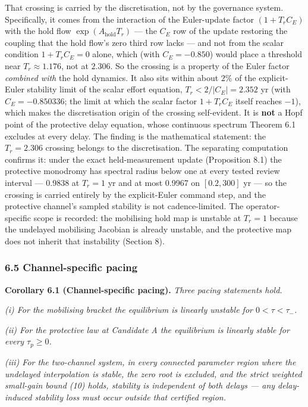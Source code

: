\documentclass[11pt]{article}
\begin{document}
That crossing is carried by the discretisation, not by the governance
system. Specifically, it comes from the interaction of the Euler-update
factor \((1 + T_r C_E)\) with the hold flow
\(\exp(A_{\mathrm{hold}}T_r)\) --- the \(C_E\) row of the update
restoring the coupling that the hold flow's zero third row lacks --- and
not from the scalar condition \(1 + T_r C_E = 0\) alone, which (with
\(C_E = -0.850\)) would place a threshold near \(T_r \approx 1.176\),
not at \(2.306\). So the crossing is a property of the Euler factor
\emph{combined with} the hold dynamics. It also sits within about
\(2\%\) of the explicit-Euler stability limit of the scalar effort
equation, \(T_r < 2/|C_E| = 2.352\) yr (with \(C_E = -0.850336\); the
limit at which the scalar factor \(1 + T_r C_E\) itself reaches \(-1\)),
which makes the discretisation origin of the crossing self-evident. It
is \textbf{not} a Hopf point of the protective delay equation, whose
continuous spectrum Theorem 6.1 excludes at every delay. The finding is
the mathematical statement: the \(T_r = 2.306\) crossing belongs to the
discretisation. The separating computation confirms it: under the exact
held-measurement update (Proposition 8.1) the protective monodromy has
spectral radius below one at every tested review interval --- 0.9838 at
\(T_r = 1\) yr and at most 0.9967 on \([0.2, 300]\) yr --- so the
crossing is carried entirely by the explicit-Euler command step, and the
protective channel's sampled stability is not cadence-limited. The
operator-specific scope is recorded: the mobilising hold map is unstable
at \(T_r = 1\) because the undelayed mobilising Jacobian is already
unstable, and the protective map does not inherit that instability
(Section 8).

\subsubsection{6.5 Channel-specific
pacing}\label{channel-specific-pacing}

\textbf{Corollary 6.1 (Channel-specific pacing).} \emph{Three pacing
statements hold.}

\emph{(i) For the mobilising bracket the equilibrium is linearly
unstable for \(0 < \tau < \tau_-\).}

\emph{(ii) For the protective law at Candidate A the equilibrium is
linearly stable for every \(\tau_p \ge 0\).}

\emph{(iii) For the two-channel system, in every connected parameter
region where the undelayed interpolation is stable, the zero root is
excluded, and the strict weighted small-gain bound (10) holds, stability
is independent of both delays --- any delay-induced stability loss must
occur outside that certified region.}
\end{document}
